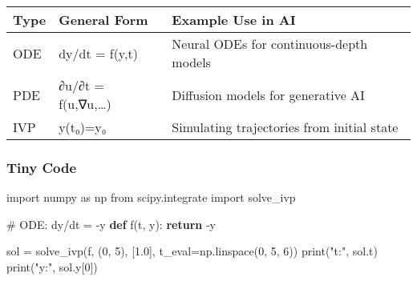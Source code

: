 \documentclass[
  letterpaper,
  DIV=11,
  numbers=noendperiod]{scrreprt}
\newenvironment{Shaded}{\begin{snugshade}}{\end{snugshade}}
\newcommand{\BuiltInTok}[1]{\textcolor[rgb]{0.00,0.23,0.31}{#1}}
\newcommand{\CommentTok}[1]{\textcolor[rgb]{0.37,0.37,0.37}{#1}}
\newcommand{\ControlFlowTok}[1]{\textcolor[rgb]{0.00,0.23,0.31}{\textbf{#1}}}
\newcommand{\DecValTok}[1]{\textcolor[rgb]{0.68,0.00,0.00}{#1}}
\newcommand{\FloatTok}[1]{\textcolor[rgb]{0.68,0.00,0.00}{#1}}
\newcommand{\ImportTok}[1]{\textcolor[rgb]{0.00,0.46,0.62}{#1}}
\newcommand{\KeywordTok}[1]{\textcolor[rgb]{0.00,0.23,0.31}{\textbf{#1}}}
\newcommand{\NormalTok}[1]{\textcolor[rgb]{0.00,0.23,0.31}{#1}}
\newcommand{\OperatorTok}[1]{\textcolor[rgb]{0.37,0.37,0.37}{#1}}
\newcommand{\StringTok}[1]{\textcolor[rgb]{0.13,0.47,0.30}{#1}}
\begin{document}
\begin{longtable}[]{@{}
  >{\raggedright\arraybackslash}p{}
  >{\raggedright\arraybackslash}p{}
  >{\raggedright\arraybackslash}p{}@{}}
\toprule\noalign{}
\begin{minipage}[b]{\linewidth}\raggedright
Type
\end{minipage} & \begin{minipage}[b]{\linewidth}\raggedright
General Form
\end{minipage} & \begin{minipage}[b]{\linewidth}\raggedright
Example Use in AI
\end{minipage} \\
\midrule\noalign{}
\endhead
\bottomrule\noalign{}
\endlastfoot
ODE & dy/dt = f(y,t) & Neural ODEs for continuous-depth models \\
PDE & ∂u/∂t = f(u,∇u,\ldots) & Diffusion models for generative AI \\
IVP & y(t₀)=y₀ & Simulating trajectories from initial state \\
\end{longtable}

\subsubsection{Tiny Code}\label{tiny-code-118}

\begin{Shaded}
\begin{Highlighting}[]
\ImportTok{import}\NormalTok{ numpy }\ImportTok{as}\NormalTok{ np}
\ImportTok{from}\NormalTok{ scipy.integrate }\ImportTok{import}\NormalTok{ solve\_ivp}

\CommentTok{\# ODE: dy/dt = {-}y}
\KeywordTok{def}\NormalTok{ f(t, y):}
    \ControlFlowTok{return} \OperatorTok{{-}}\NormalTok{y}

\NormalTok{sol }\OperatorTok{=}\NormalTok{ solve\_ivp(f, (}\DecValTok{0}\NormalTok{, }\DecValTok{5}\NormalTok{), [}\FloatTok{1.0}\NormalTok{], t\_eval}\OperatorTok{=}\NormalTok{np.linspace(}\DecValTok{0}\NormalTok{, }\DecValTok{5}\NormalTok{, }\DecValTok{6}\NormalTok{))}
\BuiltInTok{print}\NormalTok{(}\StringTok{"t:"}\NormalTok{, sol.t)}
\BuiltInTok{print}\NormalTok{(}\StringTok{"y:"}\NormalTok{, sol.y[}\DecValTok{0}\NormalTok{])}
\end{Highlighting}
\end{Shaded}
\end{document}
